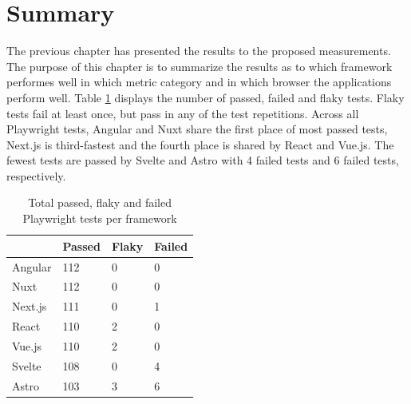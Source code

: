 \documentclass[a4paper, 12pt]{article}
\begin{document}
\section{Summary}\label{sec:summary}

The previous chapter has presented the results to the proposed measurements.
The purpose of this chapter is to summarize the results as to which framework performes well in which metric category and in which browser the applications perform well.
Table \ref{tab:playwright:total} displays the number of passed, failed and flaky tests.
Flaky tests fail at least once, but pass in any of the test repetitions.
Across all Playwright tests, Angular and Nuxt share the first place of most passed tests, Next.js is third-fastest and the fourth place is shared by React and Vue.js.
The fewest tests are passed by Svelte and Astro with 4 failed tests and 6 failed tests, respectively.

\begin{table}[!ht]
  \centering
  \begin{tabular}{|l|l|l|l|}
    \hline
    ~         & \textbf{Passed} & \textbf{Flaky}  & \textbf{Failed} \\ \hline
    Angular   & 112             & 0               & 0               \\ \hline
    Nuxt      & 112             & 0               & 0               \\ \hline
    Next.js   & 111             & 0               & 1               \\ \hline
    React     & 110             & 2               & 0               \\ \hline
    Vue.js    & 110             & 2               & 0               \\ \hline
    Svelte    & 108             & 0               & 4               \\ \hline
    Astro     & 103             & 3               & 6               \\ \hline
  \end{tabular}
  \caption{Total passed, flaky and failed Playwright tests per framework}
  \label{tab:playwright:total}
\end{table}
\end{document}
